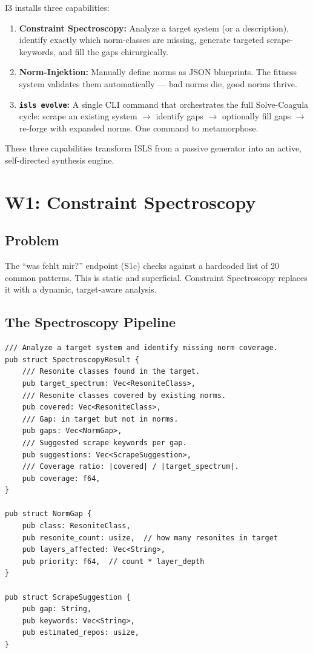 \documentclass[11pt,a4paper]{article}
\begin{document}
I3 installs three capabilities:

\begin{enumerate}[nosep]
\item \textbf{Constraint Spectroscopy:} Analyze a target system 
      (or a description), identify exactly which norm-classes 
      are missing, generate targeted scrape-keywords, and 
      fill the gaps chirurgically.
\item \textbf{Norm-Injektion:} Manually define norms as JSON 
      blueprints. The fitness system validates them 
      automatically --- bad norms die, good norms thrive.
\item \textbf{\texttt{isls evolve}:} A single CLI command that 
      orchestrates the full Solve-Coagula cycle: scrape an 
      existing system $\to$ identify gaps $\to$ optionally 
      fill gaps $\to$ re-forge with expanded norms. One 
      command to metamorphose.
\end{enumerate}

These three capabilities transform ISLS from a passive 
generator into an active, self-directed synthesis engine.


\section{W1: Constraint Spectroscopy}
\label{sec:w1}

\subsection{Problem}

The ``was fehlt mir?'' endpoint (S1c) checks against a 
hardcoded list of 20 common patterns. This is static and 
superficial. Constraint Spectroscopy replaces it with a 
dynamic, target-aware analysis.

\subsection{The Spectroscopy Pipeline}

\begin{lstlisting}[style=rust]
/// Analyze a target system and identify missing norm coverage.
pub struct SpectroscopyResult {
    /// Resonite classes found in the target.
    pub target_spectrum: Vec<ResoniteClass>,
    /// Resonite classes covered by existing norms.
    pub covered: Vec<ResoniteClass>,
    /// Gap: in target but not in norms.
    pub gaps: Vec<NormGap>,
    /// Suggested scrape keywords per gap.
    pub suggestions: Vec<ScrapeSuggestion>,
    /// Coverage ratio: |covered| / |target_spectrum|.
    pub coverage: f64,
}

pub struct NormGap {
    pub class: ResoniteClass,
    pub resonite_count: usize,  // how many resonites in target
    pub layers_affected: Vec<String>,
    pub priority: f64,  // count * layer_depth
}

pub struct ScrapeSuggestion {
    pub gap: String,
    pub keywords: Vec<String>,
    pub estimated_repos: usize,
}
\end{lstlisting}
\end{document}
